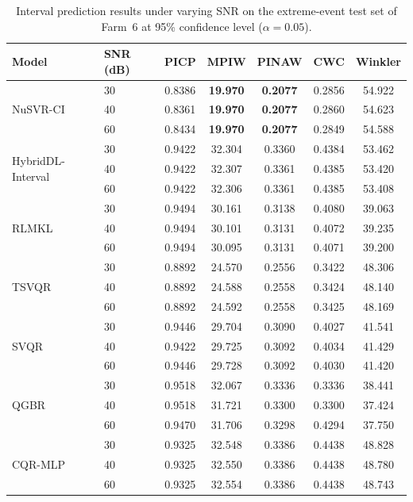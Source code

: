 \documentclass[a4paper]{cas-sc}
\begin{document}
\begin{table}[ht]
\centering
\caption{Interval prediction results under varying SNR on the extreme-event test set of Farm~6 at 95\% confidence level ($\alpha = 0.05$).}
\setlength{\tabcolsep}{3.0mm}
\begin{tabular}{llccccc}
\toprule
Model & SNR (dB) & PICP & MPIW & PINAW & CWC & Winkler \\
\midrule
\multirow{3}{*}{NuSVR-CI}
  & 30 & 0.8386 & \textbf{19.970} & \textbf{0.2077} & 0.2856 & 54.922 \\
  & 40 & 0.8361 & \textbf{19.970} & \textbf{0.2077} & 0.2860 & 54.623 \\
  & 60 & 0.8434 & \textbf{19.970} & \textbf{0.2077} & 0.2849 & 54.588 \\
\multirow{3}{*}{HybridDL-Interval}
  & 30 & 0.9422 & 32.304 & 0.3360 & 0.4384 & 53.462 \\
  & 40 & 0.9422 & 32.307 & 0.3361 & 0.4385 & 53.420 \\
  & 60 & 0.9422 & 32.306 & 0.3361 & 0.4385 & 53.408 \\
\multirow{3}{*}{RLMKL}
  & 30 & 0.9494 & 30.161 & 0.3138 & 0.4080 & 39.063 \\
  & 40 & 0.9494 & 30.101 & 0.3131 & 0.4072 & 39.235 \\
  & 60 & 0.9494 & 30.095 & 0.3131 & 0.4071 & 39.200 \\
\multirow{3}{*}{TSVQR}
  & 30 & 0.8892 & 24.570 & 0.2556 & 0.3422 & 48.306 \\
  & 40 & 0.8892 & 24.588 & 0.2558 & 0.3424 & 48.140 \\
  & 60 & 0.8892 & 24.592 & 0.2558 & 0.3425 & 48.169 \\
\multirow{3}{*}{SVQR}
  & 30 & 0.9446 & 29.704 & 0.3090 & 0.4027 & 41.541 \\
  & 40 & 0.9422 & 29.725 & 0.3092 & 0.4034 & 41.429 \\
  & 60 & 0.9446 & 29.728 & 0.3092 & 0.4030 & 41.420 \\
\multirow{3}{*}{QGBR}
  & 30 & 0.9518 & 32.067 & 0.3336 & 0.3336 & 38.441 \\
  & 40 & 0.9518 & 31.721 & 0.3300 & 0.3300 & 37.424 \\
  & 60 & 0.9470 & 31.706 & 0.3298 & 0.4294 & 37.750 \\
\multirow{3}{*}{CQR-MLP}
  & 30 & 0.9325 & 32.548 & 0.3386 & 0.4438 & 48.828 \\
  & 40 & 0.9325 & 32.550 & 0.3386 & 0.4438 & 48.780 \\
  & 60 & 0.9325 & 32.554 & 0.3386 & 0.4438 & 48.743 \\

\end{tabular}
\end{table}
\end{document}
